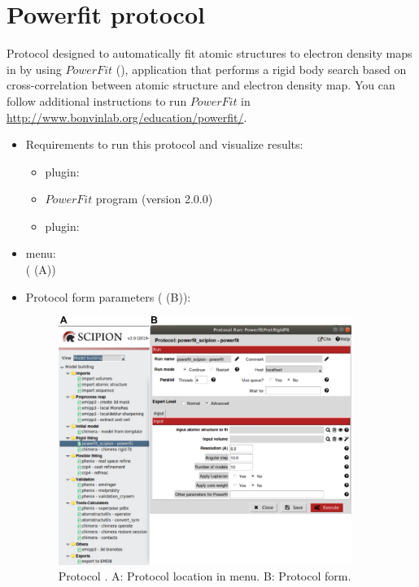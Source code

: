 \section{Powerfit protocol}
\label{app:powerfitProtocol}%
Protocol designed to automatically fit atomic structures to electron density maps in \scipion by using $PowerFit$ (\citep{vanzundert2016}), application that performs a rigid body search based on cross-correlation between atomic structure and electron density map. You can follow additional instructions to run $PowerFit$ in \url{http://www.bonvinlab.org/education/powerfit/}.
   
 \begin{itemize}
  \item Requirements to run this protocol and visualize results:
    \begin{itemize}
        \item \scipion plugin: 
        \item $PowerFit$ program (version 2.0.0)
        \item \scipion plugin: 
    \end{itemize}
  \item \scipion menu:\\
    ( (A))
  
  \item Protocol form parameters ( (B)):
  
    \begin{figure}[H]
     \centering 
     \captionsetup{width=.7\linewidth} 
     \includegraphics[width=0.90\textwidth]{Images_appendix/Fig113.pdf}
     \caption{Protocol . A: Protocol location in \scipion menu. B: Protocol form.}
     \label{fig:app_protocol_powerfit_1}
    \end{figure}


\end{itemize}
